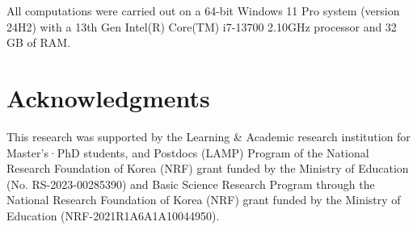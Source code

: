 All computations were carried out on a 64-bit Windows 11 Pro system (version 24H2) with a 13th Gen Intel(R) Core(TM) i7-13700 2.10GHz processor and 32 GB of RAM.

\section*{Acknowledgments}
This research was supported by the Learning \& Academic research institution for Master’s·PhD students, and Postdocs (LAMP) Program of the National Research Foundation of Korea (NRF) grant funded by the Ministry of Education (No. RS-2023-00285390) and Basic Science Research Program through the National Research Foundation of Korea (NRF) grant funded by the Ministry of Education (NRF-2021R1A6A1A10044950).



\address{Chul Moon\\
  Department of Statistics and Data Science\\
  Southern Methodist University\\
  Dallas, Texas, USA\\
  (0000-0002-2892-5449)\\
  }

\address{Soohyun Ahn\\
  Department of Mathematics\\
  Ajou University\\
  Suwon, Republic of Korea\\
  (0000-0001-5016-5469)\\
  \textit{Corresponding author:} }

